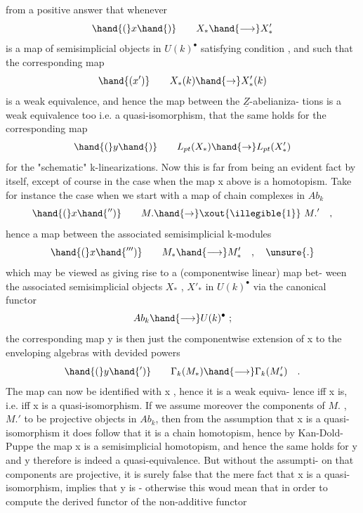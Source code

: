 
from a positive answer that whenever
\[ \hand{(}x\hand{)} \qquad X_* \hand{\longrightarrow} X'_* \]
is a map of semisimplicial objects in $U(k)^\bullet$ satisfying condition ,
and such that the corresponding map
\[ \hand{(x')} \qquad X_*(k) \hand{\to} X'_*(k) \]
is a weak equivalence, and  hence the map between the $\underline{Z}$-abelianiza-%
tions is a weak equivalence too i.e. a quasi-isomorphism, that the same
holds for the corresponding map
\[ \hand{(}y\hand{)} \qquad L_{pt}(X_*) \hand{\to} L_{pt}(X'_*) \]
for the "schematic" k-linearizations. Now this is far from being an
evident fact by itself, except of course in the case when the map \hand{(}x\hand{)}
above is a homotopism. Take for instance the case when we start with
a map of chain complexes in $Ab_k$
\[ \hand{(}x\hand{'')} \qquad M. \hand{\to} \text{\xout{\illegible{1}}}\ M.' \quad , \]
hence a map between the associated semisimplicial k-modules
\[ \hand{(}x\hand{''')} \qquad M_* \hand{\longrightarrow} M'_* \quad , \quad \unsure{.} \]
which may be viewed as giving rise to a (componentwise linear) map bet-%
ween the associated semisimplicial objects $X_*$ , $X'_*$ in $U(k)^\bullet$ via the
canonical functor
\[ Ab_k \hand{\longrightarrow} U(k)^\bullet \ ; \]
the corresponding map \hand{(}y\hand{)} is then just the componentwise extension of
\hand{(}x to the enveloping algebras with devided powers
\[ \hand{(}y\hand{')} \qquad \Gamma_k(M_*) \hand{\longrightarrow} \Gamma_k(M'_*) \quad . \]
The map  can now be identified with \hand{(}x , hence it is a weak equiva-%
lence iff \hand{(}x is, i.e. iff \hand{(}x is a quasi-isomorphism. If we assume
moreover the components of $M.$ ,  $M.'$ to be projective objects in $Ab_k$,
then from the assumption that \hand{(}x is a quasi-isomorphism it does follow
that it is a chain homotopism, hence by Kan-Dold-Puppe the map \hand{(}x
is a semisimplicial homotopism, and hence the same holds for \hand{(}y\hand{,} and
\hand{(}y therefore is indeed a quasi-equivalence. But without the assumpti-%
on that components are projective, it is surely false that the mere
fact that \hand{(}x is a quasi-isomorphism, implies that \hand{(}y is - otherwise
this woud mean that in order to compute the  derived functor of the
non-additive functor 


